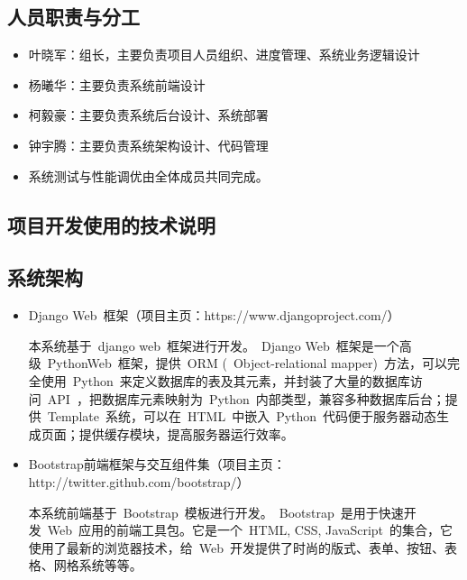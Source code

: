 \appendix
\begin{center}
  \section{人员职责与分工}
\end{center}

\begin{itemize}
  \item 叶晓军：组长，主要负责项目人员组织、进度管理、系统业务逻辑设计
  \item 杨曦华：主要负责系统前端设计
  \item 柯毅豪：主要负责系统后台设计、系统部署
  \item 钟宇腾：主要负责系统架构设计、代码管理
  \item 系统测试与性能调优由全体成员共同完成。
\end{itemize}


\newpage

\begin{center}
  \section{项目开发使用的技术说明}
\end{center}

\subsection{系统架构}
\begin{itemize}
  \item Django Web~框架（项目主页：https://www.djangoproject.com/）
  
  \CJKindent 本系统基于~django web~框架进行开发。~Django Web~框架是一个高级~Python\footnotemark[1] Web~框架，提供~ORM (~Object-relational mapper)~方法，可以完全使用~Python~来定义数据库的表及其元素，并封装了大量的数据库访问~API~，把数据库元素映射为~Python~内部类型，兼容多种数据库后台；提供~Template~系统，可以在~HTML~中嵌入~Python~代码便于服务器动态生成页面；提供缓存模块，提高服务器运行效率。
  
  \item Bootstrap前端框架与交互组件集（项目主页：http://twitter.github.com/bootstrap/）
  
  \CJKindent 本系统前端基于~Bootstrap~模板进行开发。~Bootstrap~是用于快速开发~Web~应用的前端工具包。它是一个~HTML, CSS, JavaScript~的集合，它使用了最新的浏览器技术，给~Web~开发提供了时尚的版式、表单、按钮、表格、网格系统等等。
\end{itemize}

